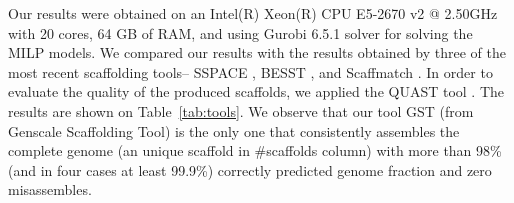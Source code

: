 

 

Our results were obtained on an  Intel(R) Xeon(R) CPU E5-2670 v2 @ 2.50GHz with 20 cores, 64 GB of RAM, and using Gurobi 6.5.1 solver for solving the MILP models. We compared our results with the results obtained by three of the most recent scaffolding tools--  SSPACE \cite{boetzer_scaffolding_2011},  BESST \cite{BESST}, and Scaffmatch  \cite{Mandric17042015}.
In order to evaluate the   quality of  the produced scaffolds, we applied the QUAST tool  \cite{gurevich_quast:_2013}.
The results are shown on Table~\ref{tab:tools}.
 We observe that our tool GST (from Genscale Scaffolding Tool) is the only one that consistently  assembles the complete genome (an unique scaffold in \#scaffolds column) with more than 98\% (and in four cases at least 99.9\%) correctly predicted genome fraction and zero misassembles. 
 
 

